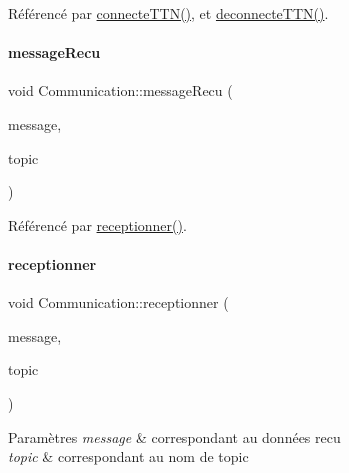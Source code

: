 Référencé par \hyperlink{class_communication_af71587fb1ee9b7460345b7c12372a1eb}{connecte\+T\+T\+N()}, et \hyperlink{class_communication_ab0f5a47c2fc7dbca198bfab2c0ac65bb}{deconnecte\+T\+T\+N()}.

\mbox{\label{class_communication_a83865ed4092e263f42669dff0582b7e1}} 
\paragraph{\texorpdfstring{message\+Recu}{messageRecu}}
{\footnotesize\ttfamily void Communication\+::message\+Recu (\begin{DoxyParamCaption}\item[{const Q\+Byte\+Array \&}]{message,  }\item[{const Q\+Mqtt\+Topic\+Name \&}]{topic }\end{DoxyParamCaption})\hspace{0.3cm}{\ttfamily [signal]}}



Référencé par \hyperlink{class_communication_a9a0c0ce96c86cbb3e59529b2334819f3}{receptionner()}.

\mbox{\label{class_communication_a9a0c0ce96c86cbb3e59529b2334819f3}} 
\paragraph{\texorpdfstring{receptionner}{receptionner}}
{\footnotesize\ttfamily void Communication\+::receptionner (\begin{DoxyParamCaption}\item[{const Q\+Byte\+Array \&}]{message,  }\item[{const Q\+Mqtt\+Topic\+Name \&}]{topic }\end{DoxyParamCaption})\hspace{0.3cm}{\ttfamily [slot]}}


\begin{DoxyParams}{Paramètres}
{\em message} & correspondant au données recu \\
\hline
{\em topic} & correspondant au nom de topic \\
\hline
\end{DoxyParams}


